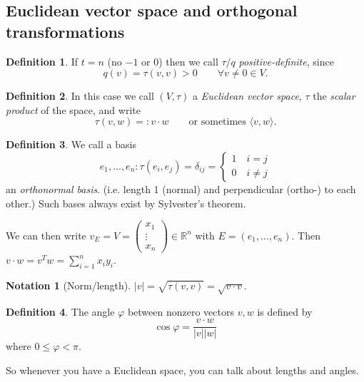 \documentclass[a4paper]{article}
\theoremstyle{definition}
\newtheorem{defn}{Definition}[subsection]
\newtheorem*{notation}{Notation}
\begin{document}
\subsection{Euclidean vector space and orthogonal transformations}
\begin{defn}
If $t=n$ (no $-1$ or 0) then we call $\tau/q$ \textit{positive-definite}, since
\[
q(v)=\tau(v,v) >0 \qquad \forall v\neq 0 \in V.
\]
\end{defn}
\begin{defn}
In this case we call $(V,\tau)$ a \textit{Euclidean vector space}, $\tau$ the \textit{scalar product} of the space, and write
\[
\tau(v,w) =: v\cdot w \qquad \text{or sometimes }\langle v,w\rangle .
\]
\end{defn}
\begin{defn}
We call a basis
\[
e_1,\ldots,e_n:\tau(e_i,e_j) = \delta_{ij}=\left\{\begin{aligned}
1 \quad i=j \\ 0 \quad i\neq j
\end{aligned} \right.
\]
an \textit{orthonormal basis}. (i.e. length 1 (normal) and perpendicular (ortho-) to each other.) Such bases always exist by Sylvester's theorem.
\end{defn}
We can then write $v_E=V=\begin{pmatrix}
x_1\\ \vdots \\ x_n
\end{pmatrix} \in \mathbb R^n$ with $E=(e_1,\ldots,e_n)$. Then $\displaystyle v\cdot w=v^Tw = \sum_{i=1}^n x_i y_i$.
\begin{notation}[Norm/length]
    $|v| = \sqrt{\tau(v,v)} = \sqrt{v\cdot v}.$
\end{notation}
\begin{defn}
The angle $\varphi$ between nonzero vectors $v,w$ is defined by
\[
\cos \varphi = \frac{v\cdot w}{|v||w|}
\]
where $0\leq \varphi < \pi$.
\end{defn}
So whenever you have a Euclidean space, you can talk about lengths and angles.
\end{document}
